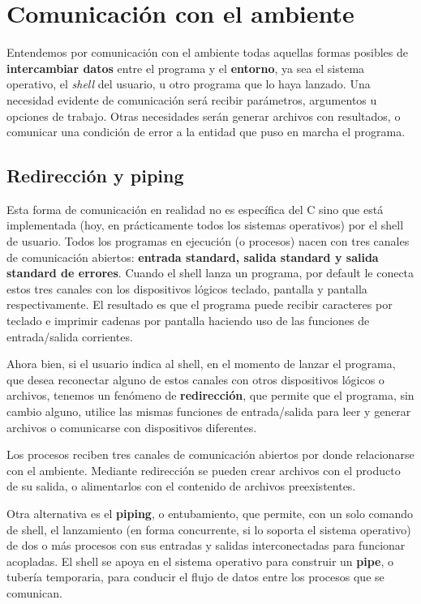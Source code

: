 



\chapter{Comunicación con el ambiente}
Entendemos por comunicación con el ambiente todas aquellas formas posibles de
\textbf{intercambiar datos} entre el programa y el \textbf{entorno}, ya sea el sistema operativo,
el \textit{shell} del usuario, u otro programa que lo haya lanzado. Una necesidad
evidente de comunicación será recibir parámetros, argumentos u opciones de
trabajo. Otras necesidades serán generar archivos con resultados, o comunicar
una condición de error a la entidad que puso en marcha el programa.

\section{Redirección y piping}
Esta forma de comunicación en realidad no es específica del C sino que está
implementada (hoy, en prácticamente todos los sistemas operativos) por el shell
de usuario. Todos los programas en ejecución (o procesos) nacen con tres
canales de comunicación abiertos: \textbf{entrada standard, salida standard y salida
standard de errores}. Cuando el shell lanza un programa, por default le conecta
estos tres canales con los dispositivos lógicos teclado, pantalla y pantalla
respectivamente. El resultado es que el programa puede recibir caracteres por
teclado e imprimir cadenas por pantalla haciendo uso de las funciones de
entrada/salida corrientes.

Ahora bien, si el usuario indica al shell, en el momento de lanzar el programa,
que desea reconectar alguno de estos canales con otros dispositivos lógicos o
archivos, tenemos un fenómeno de \textbf{redirección}, que permite que el programa, sin
cambio alguno, utilice las mismas funciones de entrada/salida para leer y
generar archivos o comunicarse con dispositivos diferentes.

            Los procesos reciben tres canales de comunicación abiertos por donde
 relacionarse con el ambiente. Mediante redirección se pueden crear archivos con
           el producto de su salida, o alimentarlos con el contenido de archivos
                                                                  preexistentes.

Otra alternativa es el \textbf{piping}, o entubamiento, que permite, con un solo comando
de shell, el lanzamiento (en forma concurrente, si lo soporta el sistema
operativo) de dos o más procesos con sus entradas y salidas interconectadas
para funcionar acopladas. El shell se apoya en el sistema operativo para
construir un \textbf{pipe}, o tubería temporaria, para conducir el flujo de datos entre
los procesos que se comunican.

